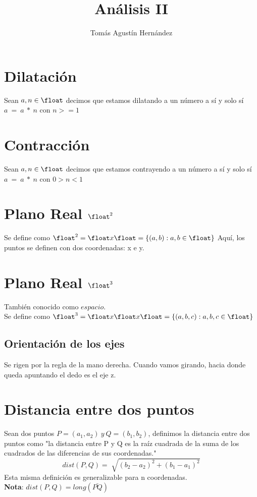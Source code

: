 \documentclass[10pt,a4paper]{article}
\title{Análisis II}
\author{Tomás Agustín Hernández}
\date{}
\begin{document}
\maketitle

\begin{figure}[b]
    \centering
\end{figure}
\newpage
\section*{Dilatación}
Sean $a, n \in \float $ decimos que estamos dilatando a un número a sí y solo sí $ a \ = \ a \ * \ n$ con $n >= 1$
\section*{Contracción}
Sean $a, n \in \float $ decimos que estamos contrayendo a un número a sí y solo sí $ a \ = \ a \ * \ n$ con $ 0 > n < 1$
\section*{Plano Real $\float^{2}$}
Se define como $\float^{2} = \float x \float = \{(a, b): a, b \in \float\}$
Aquí, los puntos se definen con dos coordenadas: x e y.
\section*{Plano Real $\float^{3}$}
También conocido como $espacio$. \\
Se define como $\float^{3} = \float x \float x \float = \{(a, b, c): a, b, c \in \float\}$
\subsection*{Orientación de los ejes}
Se rigen por la regla de la mano derecha. Cuando vamos girando, hacia donde queda apuntando el dedo es el eje z.
\section*{Distancia entre dos puntos}
Sean dos puntos $P = (a_{1}, a_{2}) \ y \ Q = (b_{1}, b_{2})$, definimos la distancia entre dos puntos como "la distancia entre P y Q es la raíz cuadrada de la suma de los cuadrados de las diferencias de sus coordenadas." \\ 
\[dist(P,Q) = \sqrt[]{(b_{2} - a_{2})^{2} + (b_{1} - a_{1})^{2}}\]
Esta misma definición es generalizable para n coordenadas. \\
\textbf{Nota}: $dist(P, Q) = long(\bar{PQ})$
\end{document}

